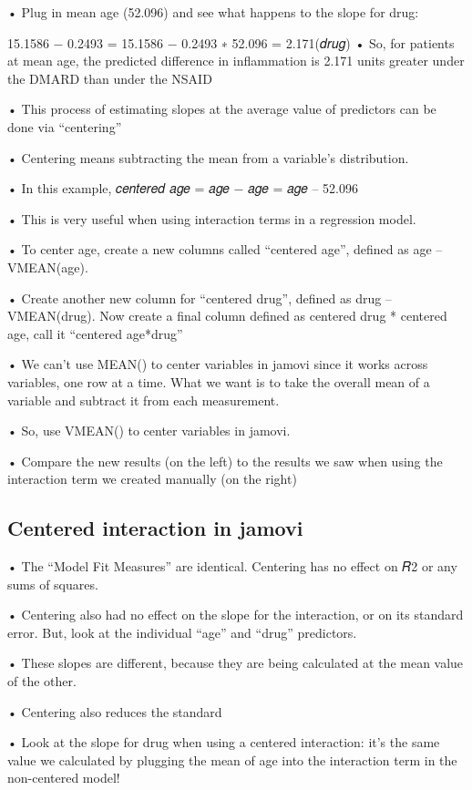 \documentclass[
  letterpaper,
  DIV=11,
  numbers=noendperiod]{scrreprt}
\begin{document}
• Plug in mean age (52.096) and see what happens to the slope for drug:

15.1586 − 0.2493 = 15.1586 − 0.2493 ∗ 52.096 = 2.171(𝑑𝑟𝑢𝑔) • So, for
patients at mean age, the predicted difference in inflammation is 2.171
units greater under the DMARD than under the NSAID

• This process of estimating slopes at the average value of predictors
can be done via ``centering''

• Centering means subtracting the mean from a variable's distribution.

• In this example, 𝑐𝑒𝑛𝑡𝑒𝑟𝑒𝑑 𝑎𝑔𝑒 = 𝑎𝑔𝑒 − 𝑎𝑔𝑒 = 𝑎𝑔𝑒 -- 52.096

• This is very useful when using interaction terms in a regression
model.

• To center age, create a new columns called ``centered age'', defined
as age -- VMEAN(age).

• Create another new column for ``centered drug'', defined as drug --
VMEAN(drug). Now create a final column defined as centered drug *
centered age, call it ``centered age*drug''

• We can't use MEAN() to center variables in jamovi since it works
across variables, one row at a time. What we want is to take the overall
mean of a variable and subtract it from each measurement.

• So, use VMEAN() to center variables in jamovi.

• Compare the new results (on the left) to the results we saw when using
the interaction term we created manually (on the right)

\hypertarget{centered-interaction-in-jamovi}{%
\subsection{Centered interaction in
jamovi}\label{centered-interaction-in-jamovi}}

• The ``Model Fit Measures'' are identical. Centering has no effect on
𝑅2 or any sums of squares.

• Centering also had no effect on the slope for the interaction, or on
its standard error. But, look at the individual ``age'' and ``drug''
predictors.

• These slopes are different, because they are being calculated at the
mean value of the other.

• Centering also reduces the standard

• Look at the slope for drug when using a centered interaction: it's the
same value we calculated by plugging the mean of age into the
interaction term in the non-centered model!
\end{document}
